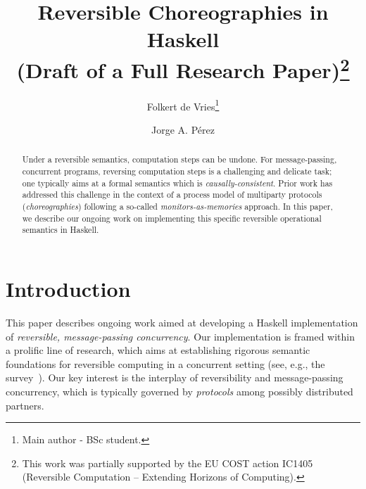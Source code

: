 \documentclass[runningheads]{llncs}
\institute{University of Groningen, The Netherlands, \\ \texttt{}}
\begin{document}
%
\title{Reversible Choreographies in Haskell \\ (Draft of a Full Research Paper)\thanks{This work was partially supported by the EU COST action IC1405 (Reversible Computation -- Extending Horizons of Computing).}}
%
%
\author{Folkert de Vries\thanks{Main author - BSc student.} \and
Jorge A. P\'{e}rez%
}
%
%
%
\maketitle              %
%
\vspace{-5mm}
\begin{abstract}
Under a reversible semantics, computation steps can be undone. 
For message-passing, concurrent programs, reversing computation steps is a challenging and delicate task; one typically aims at a formal semantics which is \emph{causal\-ly-consistent}. 
Prior work has addressed this challenge in the context of a process model of multiparty protocols (\emph{choreographies}) following a so-called \emph{monitors-as-memories} approach.
In this paper, we describe our ongoing work on implementing this specific reversible operational semantics in Haskell. 
\end{abstract}
%
%
%
\section{Introduction}
This paper describes ongoing work aimed at developing a Haskell implementation of 
\emph{reversible, message-passing concurrency}. 
Our implementation is framed within a prolific line of research, which aims at  
establishing rigorous semantic foundations for reversible computing in a 
concurrent setting (see, e.g., the survey~\cite{DBLP:journals/eatcs/Lanese14}).
Our key interest is the interplay of reversibility and message-passing concurrency, which is typically governed by
\emph{protocols} among possibly distributed partners.
\end{document}
